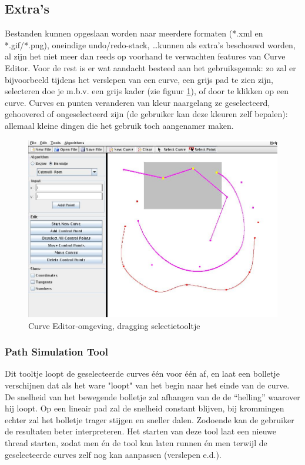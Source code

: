 \documentclass[a4paper,11pt,oneside, titlepage]{article}
\begin{document}
\subsection{Extra's}
Bestanden kunnen opgeslaan worden naar meerdere formaten (*.xml en *.gif/*.png), oneindige undo/redo-stack, \ldots  kunnen als extra's beschouwd worden, al zijn het niet meer dan reeds op voorhand te verwachten features van Curve Editor. Voor de rest is er wat aandacht besteed aan het gebruiksgemak: zo zal er bijvoorbeeld tijdens het verslepen van een curve, een grijs pad te zien zijn, selecteren doe je m.b.v. een grijs kader (zie figuur \ref{scrSel}), of door te klikken op een curve. Curves en punten veranderen van kleur naargelang ze geselecteerd, gehoovered of ongeselecteerd zijn (de gebruiker kan deze kleuren zelf bepalen): allemaal kleine dingen die het gebruik toch aangenamer maken.
\begin{figure}[htbp]
\centering
\includegraphics[scale=0.4]{./screenies/selectPoint.jpg}
\caption{Curve Editor-omgeving, dragging selectietooltje}\label{scrSel}
\end{figure}
\subsubsection{Path Simulation Tool}
Dit tooltje loopt de geselecteerde curves \'e\'en voor \'e\'en af, en laat een bolletje verschijnen dat als het ware "loopt" van het begin naar het einde van de curve. 
De snelheid van het bewegende bolletje zal afhangen van de de ``helling'' waarover hij loopt.
Op een lineair pad zal de snelheid constant blijven, bij krommingen echter zal het bolletje
trager stijgen en sneller dalen. Zodoende kan de gebruiker de resultaten beter interpreteren.
Het starten van deze tool laat een nieuwe thread starten, zodat men \'en de tool kan laten runnen \'en men terwijl de geselecteerde curves zelf nog kan aanpassen (verslepen e.d.). 
\end{document}
